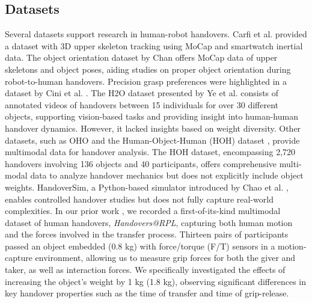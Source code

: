 \subsection{Datasets}
Several datasets support research in human-robot handovers. Carfi et al. \cite{dataset_Emaro_CARFI2019109} provided a dataset with 3D upper skeleton tracking using MoCap and smartwatch inertial data. The object orientation dataset by Chan \cite{object_orientation_dataset_chan} offers MoCap data of upper skeletons and object poses, aiding studies on proper object orientation during robot-to-human handovers. Precision grasp preferences were highlighted in a dataset by Cini et al. \cite{more_precision_type_grasp_type_location_study_dataset_cini_controzzi}. The H2O dataset presented by Ye et al. consists of annotated videos of handovers between 15 individuals for over 30 different objects, supporting vision-based tasks and providing insight into human-human handover dynamics. However, it lacked insights based on weight diversity. Other datasets, such as OHO \cite{stephan2023oho} and the Human-Object-Human (HOH) dataset \cite{wiederhold2023hoh}, provide multimodal data for handover analysis. The HOH dataset, encompassing 2,720 handovers involving 136 objects and 40 participants, offers comprehensive multi-modal data to analyze handover mechanics but does not explicitly include object weights. HandoverSim, a Python-based simulator introduced by Chao et al. \cite{chao2022handoversim}, enables controlled handover studies but does not fully capture real-world complexities. 
In our prior work \cite{dataset-khanna}, we recorded a first-of-its-kind multimodal dataset of human handovers, \textit{Handovers@RPL},  capturing both human motion and the forces involved in the transfer process. Thirteen pairs of participants passed an object embedded (0.8 kg) with force/torque (F/T) sensors in a motion-capture environment, allowing us to measure grip forces for both the giver and taker, as well as interaction forces. We specifically investigated the effects of increasing the object's weight by 1 kg (1.8 kg), observing significant differences in key handover properties such as the time of transfer and time of grip-release.



